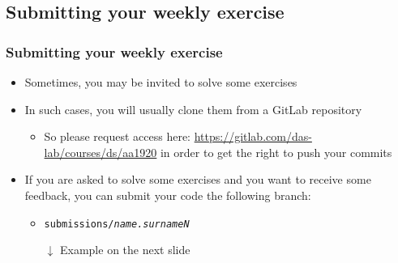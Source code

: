\documentclass[handout]{beamer}\mode<presentation>{\usetheme{AMSCesenaPurpleAndGold}}
\begin{document}
\subsection{Submitting your weekly exercise}

\begin{frame}%
\frametitle{Submitting your weekly exercise}

    \begin{itemize}

        \item Sometimes, you may be invited to solve some exercises
        
        \item In such cases, you will usually clone them from a GitLab repository
        \begin{itemize}
            \item So please request access here: \url{https://gitlab.com/das-lab/courses/ds/aa1920} in order to get the right to push your commits
        \end{itemize}
        
        \item If you are asked to solve some exercises and you want to receive some feedback, you can submit your code  the following \alert{branch}:
        \begin{itemize}
            
            \item \texttt{submissions/\alert{\textit{name.surnameN}}}%
            
            \vspace{.3cm}
        
            
            
            \vspace{.3cm}
            
            \item[$\downarrow$] Example on the next slide

        \end{itemize}

    \end{itemize}
\end{frame}
\end{document}

